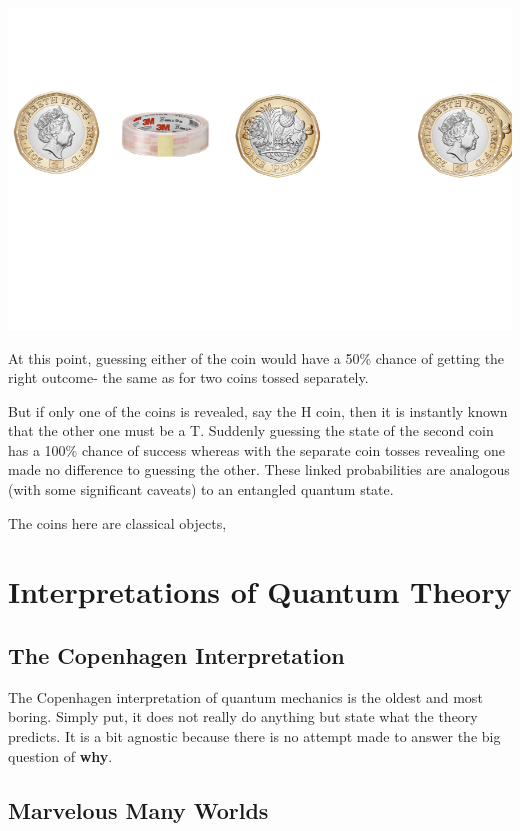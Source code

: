 \documentclass{book}
\begin{document}
\includegraphics[scale=0.4]{images/Entanglement.png}

At this point, guessing either of the coin would have a 50\% chance of getting the right outcome- the same as for two coins tossed separately. 

But if only one of the coins is revealed, say the H coin, then it is instantly known that the other one must be a T. Suddenly guessing the state of the second coin has a 100\% chance of success whereas with the separate coin tosses revealing one made no difference to guessing the other. These linked probabilities are analogous (with some significant caveats) to an entangled quantum state.

The coins here are classical objects, 

\section{Interpretations of Quantum Theory}

\subsection{The Copenhagen Interpretation}

The Copenhagen interpretation of quantum mechanics is the oldest and most boring. Simply put, it does not really do anything but state what the theory predicts. It is a bit agnostic because there is no attempt made to answer the big question of \textbf{why}.

\subsection{Marvelous Many Worlds}
\end{document}
